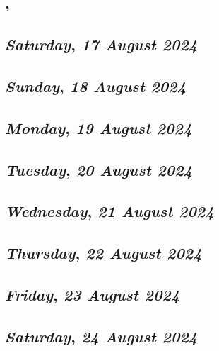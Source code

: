 \subsection*{\weekday, \day}

\def\day{\textit{17 August 2024}}
\def\weekday{\textit{Saturday}}
\subsection*{\weekday, \day}

\def\day{\textit{18 August 2024}}
\def\weekday{\textit{Sunday}}
\subsection*{\weekday, \day}

\def\day{\textit{19 August 2024}}
\def\weekday{\textit{Monday}}
\subsection*{\weekday, \day}

\def\day{\textit{20 August 2024}}
\def\weekday{\textit{Tuesday}}
\subsection*{\weekday, \day}

\def\day{\textit{21 August 2024}}
\def\weekday{\textit{Wednesday}}
\subsection*{\weekday, \day}

\def\day{\textit{22 August 2024}}
\def\weekday{\textit{Thursday}}
\subsection*{\weekday, \day}

\def\day{\textit{23 August 2024}}
\def\weekday{\textit{Friday}}
\subsection*{\weekday, \day}

\def\day{\textit{24 August 2024}}
\def\weekday{\textit{Saturday}}
\subsection*{\weekday, \day}

\def\day{\textit{25 August 2024}}
\def\weekday{\textit{Sunday}}
